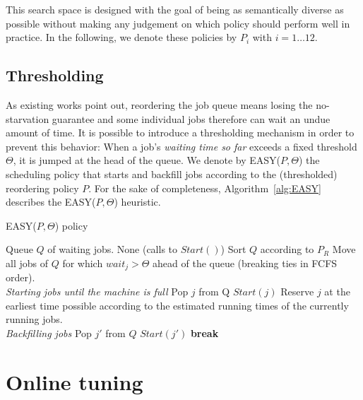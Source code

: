 \documentclass[sigconf,anonymous]{acmart}
\begin{document}
This search space is designed with the goal of being as semantically diverse as
possible without making any judgement on which policy should perform well in
practice. In the following, we denote these policies by $P_i$ with $i = 1
\ldots 12$.

\subsection{Thresholding}
\label{sub:th}
As existing works point out, reordering the job queue means losing the
no-starvation guarantee and some individual jobs therefore can wait an undue
amount of time. It is possible to introduce a thresholding mechanism in order
to prevent this behavior: When a job's \textit{waiting time so far} exceeds a
fixed threshold $\Theta$, it is jumped at the head of the queue. We denote by
EASY($P,\Theta$) the scheduling policy that starts and backfill jobs according to
the (thresholded) reordering policy $P$. For the sake of completeness,
Algorithm~\ref{alg:EASY} describes the EASY($P,\Theta$) heuristic.

\begin{algorithm}[]
  \caption{EASY($P,\Theta$) policy}
  \begin{algorithmic}[1]
    \renewcommand{\algorithmicrequire}{\textbf{Input:}}
    \renewcommand{\algorithmicensure}{\textbf{Output:}}
    \REQUIRE Queue $Q$ of waiting jobs.
    \ENSURE None (calls to $Start()$)
    \STATE Sort $Q$ according to $P_R$
    \STATE Move all jobs of $Q$ for which $wait_j > \Theta$ ahead
    of the queue (breaking ties in FCFS order).
    \\ \textit{Starting jobs until the machine is full}
    \STATE Pop $j$ from Q
    \STATE $Start(j)$
    \ELSE
    \STATE Reserve $j$ at the earliest
    time possible according to the estimated running times
    of the currently running jobs.
    \\ \textit{Backfilling jobs}
    \STATE Pop $j'$ from $Q$
    \STATE $Start(j')$
    \ENDIF
    \ENDFOR
    \STATE \textbf{break}
    \ENDIF
    \ENDFOR
  \end{algorithmic}
  \label{alg:EASY}
\end{algorithm}


\section{Online tuning}
\label{sec:online}
\end{document}
